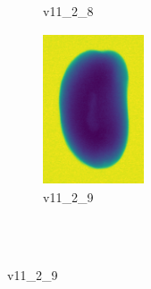 \documentclass[11pt]{article}
\begin{document}
\begin{figure}
\begin{subfigure}[b]{0.15\textwidth}
        \caption{v11\_2\_8}
         \label{fig:five over x}
     \end{subfigure}
     \hfill
    \begin{subfigure}[b]{0.15\textwidth}
         \centering
         \includegraphics[width=3cm, height=4.5cm]{images/kartofler/v11_2_9_cut.png}
        \caption{v11\_2\_9}
         \label{fig:five over x}
     \end{subfigure} 
     
     
     \\ \\
     

\end{figure}
\end{document}
